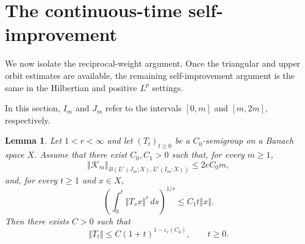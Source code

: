 \documentclass[12pt]{amsart}
\theoremstyle{plain}
\newtheorem{lemma}[thm]{Lemma}
\theoremstyle{remark}
\theoremstyle{definition}
\newcommand{\norm}[1]{\left\Vert #1\right\Vert}
\begin{document}
	\section{The continuous-time self-improvement}\label{secContinuous}
	
	We now isolate the reciprocal-weight argument. Once the triangular and upper orbit estimates are available, the remaining self-improvement argument is the same in the Hilbertian and positive $L^p$ settings.
	
	In this section, $I_m$ and $J_m$ refer to the intervals $[0,m]$ and $[m,2m]$, respectively.
	
	\begin{lemma}\label{lemContinuousSelfImprovement}
		Let $1<r<\infty$ and let $(T_t)_{t\ge0}$ be a $C_0$-semigroup on a Banach
		space $X$.  Assume that there exist $C_0,C_1>0$ such that, for every $m\ge1$,
		\begin{equation}\label{eqAbstractTriangularContinuous}
			\norm{\mathcal K_m}_{
				B(L^r(J_m;X),L^r(I_m;X))}
			\le
			2eC_0m,
		\end{equation}
		and, for every $t\ge1$ and $x\in X$,
		\begin{equation}\label{eqAbstractOrbitContinuous}
			\left(\int_0^t\norm{T_sx}^r\,ds\right)^{1/r}
			\le
			C_1t\norm{x}.
		\end{equation}
		Then there exists $C>0$ such that
		\begin{equation}\label{eqAbstractConclusionContinuous}
			\norm{T_t}
			\le
			C(1+t)^{1-\varepsilon_r(C_0)},
			\qquad t\ge0.
		\end{equation}
	\end{lemma}
	
\end{document}
